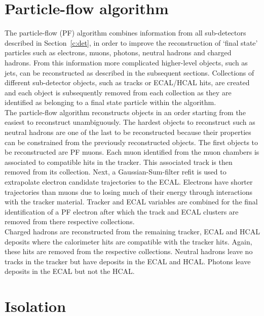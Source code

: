 \section{Particle-flow algorithm ~\label{sec:PF}}

The particle-flow (PF) algorithm combines information from all sub-detectors described in Section~\ref{c:det}, in order to improve the reconstruction of `final state' particles such as electrons, muons, photons, neutral hadrons and charged hadrons. From this information more complicated higher-level objects, such as jets, can be reconstructed as described in the subsequent sections. Collections of different sub-detector objects, such as tracks or ECAL/HCAL hits, are created and each object is subsequently removed from each collection as they are identified as belonging to a final state particle within the algorithm.\\
The particle-flow algorithm reconstructs objects in an order starting from the easiest to reconstruct unambiguously. The hardest objects to reconstruct such as neutral hadrons are one of the last to be reconstructed because their properties can be constrained from the previously reconstructed objects.
The first objects to be reconstructed are PF muons. Each muon identified from the muon chambers is associated to compatible hits in the tracker. This associated track is then removed from its collection. Next, a Gaussian-Sum-filter refit is used to extrapolate electron candidate trajectories to the ECAL. Electrons have shorter trajectories than muons due to losing much of their energy through interactions with the tracker material. Tracker and ECAL variables are combined for the final identification of a PF electron after which the track and ECAL clusters are removed from there respective collections.\\
Charged hadrons are reconstructed from the remaining tracker, ECAL and HCAL deposits where the calorimeter hits are compatible with the tracker hits. Again, these hits are removed from the respective collections. Neutral hadrons leave no tracks in the tracker but have deposits in the ECAL and HCAL. Photons leave deposits in the ECAL but not the HCAL.\\


\section{Isolation \label{sec:isolation}}

